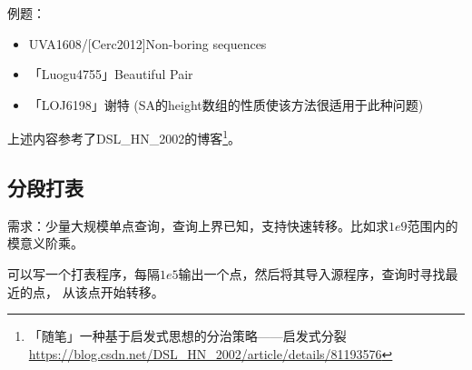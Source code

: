 例题：
\begin{itemize}
	\item UVA1608/[Cerc2012]Non-boring sequences
	\item 「Luogu4755」Beautiful Pair
	\item 「LOJ6198」谢特 (SA的height数组的性质使该方法很适用于此种问题)
\end{itemize}

上述内容参考了DSL\_HN\_2002的博客\footnote{
	「随笔」一种基于启发式思想的分治策略——启发式分裂
	\url{https://blog.csdn.net/DSL\_HN\_2002/article/details/81193576}
}。
\subsection{分段打表}
需求：少量大规模单点查询，查询上界已知，支持快速转移。比如求$1e9$范围内的模意义阶乘。

可以写一个打表程序，每隔$1e5$输出一个点，然后将其导入源程序，查询时寻找最近的点，
从该点开始转移。
